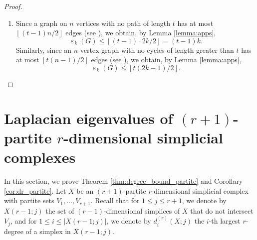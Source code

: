 \documentclass[a4paper,11pt]{article}
\theoremstyle{plain}
\theoremstyle{definition}
\numberwithin{theorem}{section}
\numberwithin{equation}{section}
\DeclareMathOperator{\eps}{\varepsilon}
\begin{document}
\begin{proof}
\begin{enumerate}
        \item  Since a graph on $n$ vertices with no path of length $t$ has at most $\left\lfloor (t-1)n/2\right\rfloor$ edges (see \cite[Chapter IV, Theorem 3]{bollobas1998modern}), we obtain, by Lemma \ref{lemma:apps},
        \[
        \eps_k(G)\le \left\lfloor (t-1)\cdot 2k/2\right\rfloor = (t-1)k.
        \]
        Similarly, since an $n$-vertex graph with no cycles of length greater than $t$ has at most $\left\lfloor t(n-1)/2\right\rfloor$ edges (see \cite[Chapter IV, Theorem 4]{bollobas1998modern}), we obtain, by Lemma \ref{lemma:apps},
        \[
        \eps_k(G)\le \left\lfloor t(2k-1)/2 \right\rfloor.
        \]
    \end{enumerate}
\end{proof}


\section{Laplacian eigenvalues of $(r+1)$-partite $r$-dimensional simplicial complexes}\label{sec:partite}

In this section, we prove Theorem \ref{thm:degree_bound_partite} and Corollary \ref{cor:dr_partite}.
Let $X$ be an $(r+1)$-partite $r$-dimensional simplicial complex with partite sets $V_1,\ldots,V_{r+1}$. Recall that for $1\le j\le r+1$, we denote by $X(r-1;j)$ the set of $(r-1)$-dimensional simplices of $X$ that do not intersect $V_j$, and for $1\le i\le |X(r-1;j)|$, we denote by 
$d^{(r)}_i(X;j)$ the $i$-th largest $r$-degree of a simplex in $X(r-1;j)$.
\end{document}
